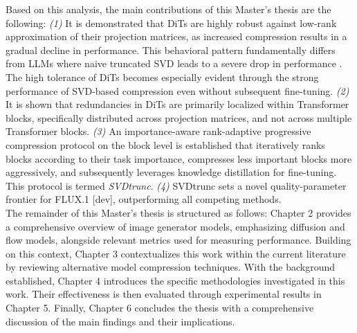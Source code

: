 	
	Based on this analysis, the main contributions of this Master's thesis are the following: \textit{(1)} It is demonstrated that \gls{DiT}s are highly robust against low-rank approximation of their projection matrices, as increased compression results in a gradual decline in performance. This behavioral pattern fundamentally differs from \gls{LLM}s where naive truncated \gls{SVD} leads to a severe drop in performance \cite{hsu2022language,wang2025dobi,SVD_LLM_V2,wang2024svd}. The high tolerance of \gls{DiT}s becomes especially evident through the strong performance of \gls{SVD}-based compression even without subsequent fine-tuning. \textit{(2)} It is shown that redundancies in \gls{DiT}s are primarily localized within Transformer blocks, specifically distributed across projection matrices, and not across multiple Transformer blocks. \textit{(3)} An importance-aware rank-adaptive progressive compression protocol on the block level is established that iteratively ranks blocks according to their task importance, compresses less important blocks more aggressively, and subsequently leverages knowledge distillation for fine-tuning. This protocol is termed \textit{SVDtrunc}. \textit{(4)} \gls{SVD}trunc sets a novel quality-parameter frontier for FLUX.1 [dev], outperforming all competing methods. \\
	
   
   
   
   The remainder of this Master's thesis is structured as follows:  Chapter 2 provides a comprehensive overview of image generator models, emphasizing diffusion and flow models, alongside relevant metrics used for measuring performance. Building on this context, Chapter 3 contextualizes this work within the current literature by reviewing alternative model compression techniques. With the background established, Chapter 4 introduces the specific methodologies investigated in this work. Their effectiveness is then evaluated through experimental results in Chapter 5. Finally, Chapter 6 concludes the thesis with a comprehensive discussion of the main findings and their implications.
   
   
